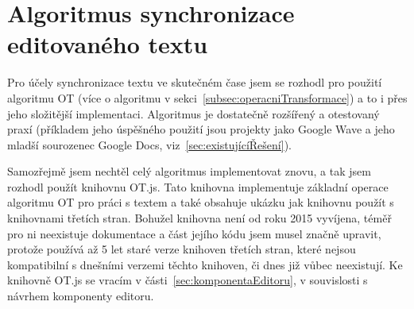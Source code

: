 
\section{Algoritmus synchronizace editovaného textu}\label{sec:synchronizaceEditovanéhoTextu}

Pro účely synchronizace textu ve skutečném čase jsem se rozhodl pro použití algoritmu \gls{OT} (více o algoritmu v sekci~\ref{subsec:operacniTransformace}) a to i přes jeho složitější implementaci.
Algoritmus je dostatečně rozšířený a otestovaný praxí (příkladem jeho úspěšného použití jsou projekty jako Google Wave a jeho mladší sourozenec Google Docs, viz~\ref{sec:existujícíŘešení}).

Samozřejmě jsem nechtěl celý algoritmus implementovat znovu, a tak jsem rozhodl použít knihovnu OT.js.
Tato knihovna implementuje základní operace algoritmu \gls{OT} pro práci s textem a také obsahuje ukázku jak knihovnu použít s knihovnami třetích stran.
Bohužel knihovna není od roku 2015 vyvíjena, téměř pro ni neexistuje dokumentace a část jejího kódu jsem musel značně upravit, protože používá až 5 let staré verze knihoven třetích stran, které nejsou kompatibilní s dnešními verzemi těchto knihoven, či dnes již vůbec neexistují.
Ke knihovně OT.js se vracím v části~\ref{sec:komponentaEditoru}, v souvislosti s návrhem komponenty editoru.
